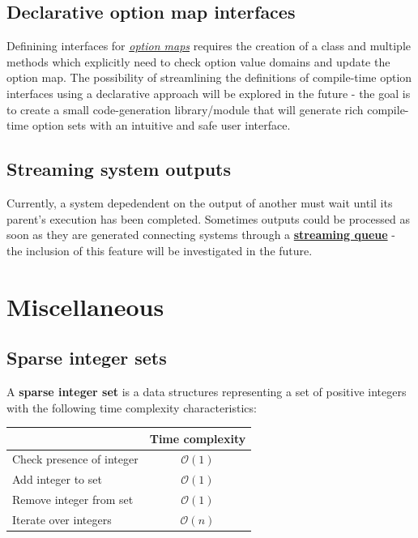 \documentclass[twoside, 12pt, a4paper, openright]{book}
\begin{document}
\section{Declarative option map
interfaces}\label{declarative-option-map-interfaces}

Definining interfaces for
\protect\hyperlink{metaprogramming_option_maps}{\emph{option maps}}
requires the creation of a class and multiple methods which explicitly
need to check option value domains and update the option map. The
possibility of streamlining the definitions of compile-time option
interfaces using a declarative approach will be explored in the future -
the goal is to create a small code-generation library/module that will
generate rich compile-time option sets with an intuitive and safe user
interface.

\section{Streaming system outputs}\label{streaming-system-outputs}

Currently, a system depedendent on the output of another must wait until
its parent's execution has been completed. Sometimes outputs could be
processed as soon as they are generated connecting systems through a
\protect\hyperlink{sys_streamqueue}{\textbf{streaming queue}} - the
inclusion of this feature will be investigated in the future.

\chapter{Miscellaneous}\label{miscellaneous}

\hypertarget{appendix_sparse_integer_sets}{\section{Sparse integer
sets}\label{appendix_sparse_integer_sets}}

A \textbf{sparse integer set} is a data structures representing a set of
positive integers with the following time complexity characteristics:

\begin{longtable}[]{@{}lc@{}}
\toprule
& Time complexity\tabularnewline
\midrule
\endhead
Check presence of integer & \(\mathcal{O}(1)\)\tabularnewline
Add integer to set & \(\mathcal{O}(1)\)\tabularnewline
Remove integer from set & \(\mathcal{O}(1)\)\tabularnewline
Iterate over integers & \(\mathcal{O}(n)\)\tabularnewline
\bottomrule
\end{longtable}
\end{document}
